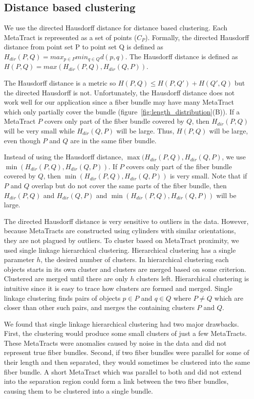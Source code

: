   
\subsection{Distance based clustering}
 \label{subsec:dist_clustering}
 We use the directed Hausdorff distance for distance based clustering.
 Each MetaTract is represented as a set of points ($C_P$). 
 Formally, the directed Hausdorff distance from point set P to point set Q is defined as 
 $H_{dir}(P,Q) = max_{p \in P} min_{q \in Q} d(p,q).$ The Hausdorff distance is defined as $H(P,Q) = max(H_{dir}(P,Q),H_{dir}(Q,P))$.
 
 The Hausdorff distance is a metric so $H(P,Q) \le H(P,Q') + H(Q',Q)$
 but the directed Hausdorff is not.
 Unfortunately, the Hausdorff distance does not work well for our application since a fiber bundle may have many MetaTract which only partially cover the bundle (figure~\ref{fig:length_distribution}(B)).
 If a MetaTract $P$ covers only part of the fiber bundle covered by $Q$,
 then $H_{dir}(P,Q)$ will be very small while $H_{dir}(Q,P)$ will be large.
 Thus, $H(P,Q)$ will be large, even though $P$ and $Q$ are in the same
 fiber bundle.
 
 Instead of using the Hausdorff distance, $\max(H_{dir}(P,Q),H_{dir}(Q,P)$, we use $\min(H_{dir}(P,Q),H_{dir}(Q,P))$. If $P$ covers only part of the fiber bundle covered by $Q$, then $\min(H_{dir}(P,Q),H_{dir}(Q,P))$ is very small.
 Note that if $P$ and $Q$ overlap but do not cover the same parts of the fiber bundle, then $H_{dir}(P,Q)$ and $H_{dir}(Q,P)$ and $\min(H_{dir}(P,Q),H_{dir}(Q,P))$ will be large.
 
 The directed Hausdorff distance is very sensitive to outliers in the data.
 However, because MetaTracts are constructed using cylinders with similar orientations, they are not plagued by outliers.
 To cluster based on MetaTract proximity, we used single linkage hierarchical clustering.
 Hierarchical clustering has a single parameter $h$, the desired number of clusters.
 In hierarchical clustering each objects starts in its own cluster and clusters are merged based on some criterion.
 Clustered are merged until there are only $h$ clusters left.
 Hierarchical clustering is intuitive since it is easy to trace how clusters are formed and merged.
 Single linkage clustering finds pairs of objects $p \in P$ and $q \in Q$ where $P \neq Q$ which are closer than other such pairs, and merges the containing clusters $P$ and $Q$.
 
 We found that single linkage hierarchical clustering had two major drawbacks.
 First, the clustering would produce some small clusters of just a few MetaTracts.
 These MetaTracts were anomalies caused by noise in the data and did not represent true fiber bundles.
 Second, if two fiber bundles were parallel for some of their length and then separated, they would sometimes be clustered into the same
 fiber bundle.
 A short MetaTract which was parallel to both and did not extend into the separation region could form a link between the two fiber bundles,
 causing them to be clustered into a single bundle.
 
